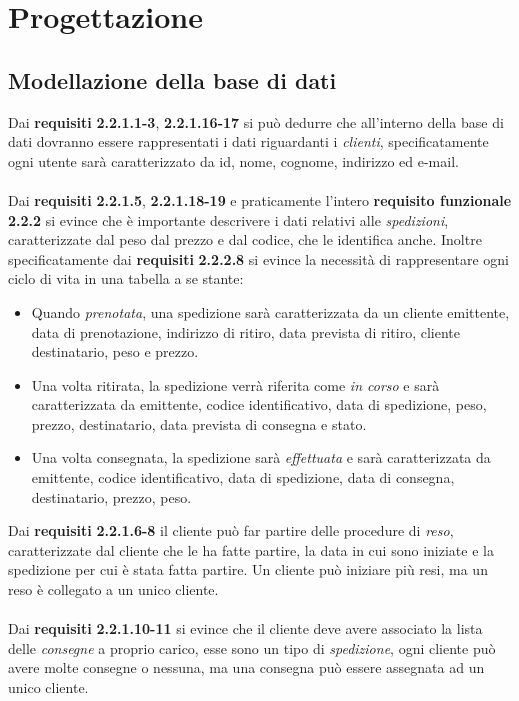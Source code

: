 \documentclass[a4paper,12pt]{article}
\begin{document}
\newpage
\section{Progettazione}
\subsection{Modellazione della base di dati}
Dai \textbf{requisiti} \textbf{2.2.1.1-3}, \textbf{2.2.1.16-17} si può dedurre che all'interno della base di dati dovranno essere rappresentati
i dati riguardanti i \textit{clienti}, specificatamente ogni utente sarà caratterizzato da id, nome, cognome, indirizzo ed e-mail. 
\\\\
Dai \textbf{requisiti} \textbf{2.2.1.5}, \textbf{2.2.1.18-19} e praticamente l'intero \textbf{requisito funzionale }\textbf{2.2.2} si evince che è importante descrivere i dati relativi alle \textit{spedizioni}, caratterizzate dal peso dal prezzo e dal codice, che le identifica anche. Inoltre specificatamente dai \textbf{requisiti} \textbf{2.2.2.8} si evince la necessità di rappresentare ogni ciclo di vita in una tabella a se stante:
\begin{itemize}
	\item Quando \textit{prenotata}, una spedizione sarà caratterizzata da un cliente emittente, data di prenotazione, 
	indirizzo di ritiro, data prevista di ritiro, cliente destinatario, peso e prezzo.
	
	\item Una volta ritirata, la spedizione verrà riferita come \textit{in corso} e sarà caratterizzata da emittente, 
	codice identificativo, data di spedizione, peso, prezzo, destinatario, data prevista di consegna e stato.
	
	\item Una volta consegnata, la spedizione sarà \textit{effettuata} e sarà caratterizzata da emittente, codice identificativo, 
	data di spedizione, data di consegna, destinatario, prezzo, peso.
\end{itemize}  
Dai \textbf{requisiti} \textbf{2.2.1.6-8} il cliente può far partire delle procedure di \textit{reso}, caratterizzate dal cliente che le ha fatte partire, la data in cui sono iniziate e la spedizione per cui è stata fatta partire. Un cliente può iniziare più resi, ma un reso è collegato a un unico cliente.
\\\\
Dai \textbf{requisiti} \textbf{2.2.1.10-11} si evince che il cliente deve avere associato la lista delle \textit{consegne} a proprio carico,  esse sono un tipo di \textit{spedizione}, ogni cliente può avere molte consegne o nessuna, ma una consegna può essere assegnata ad un unico cliente.
\end{document}
